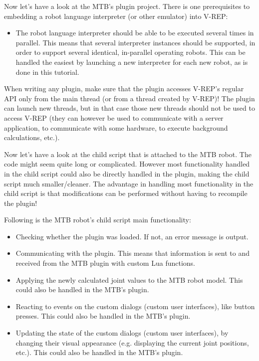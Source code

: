 Now let's have a look at the MTB's plugin project. There is one 
prerequisites to embedding a robot language interpreter (or other 
emulator) into V-REP:
\begin{itemize}[nosep]
	\item The robot language interpreter should be able to be executed 
		several times in parallel. This means that several interpreter 
		instances should be supported, in order to support several 
		identical, in-parallel operating robots. This can be handled the 
		easiest by launching a new interpreter for each new robot, as is 
		done in this tutorial.
\end{itemize}

When writing any plugin, make sure that the plugin accesses V-REP's regular 
API only from the main thread (or from a thread created by V-REP)! The plugin
can launch new threads, but in that case those new threads should not be 
used to access V-REP (they can however be used to communicate with a server 
application, to communicate with some hardware, to execute background 
calculations, etc.).

\bigskip

Now let's have a look at the child script that is attached to the MTB robot. 
The code might seem quite long or complicated. However most functionality 
handled in the child script could also be directly handled in the plugin, 
making the child script much smaller/cleaner. The advantage in handling 
most functionality in the child script is that modifications can be 
performed without having to recompile the plugin!

Following is the MTB robot's child script main functionality:
\begin{itemize}[nosep]
	\item Checking whether the plugin was loaded. If not, an error 
		message is output.
	\item Communicating with the plugin. This means that information is 
		sent to and received from the MTB plugin with custom Lua functions.
	\item Applying the newly calculated joint values to the MTB robot model. 
		This could also be handled in the MTB's plugin.
	\item Reacting to events on the custom dialogs (custom user 
		interfaces), like button presses. This could also be handled in 
		the MTB's plugin.
	\item Updating the state of the custom dialogs (custom user interfaces), 
		by changing their visual appearance (e.g. displaying the current
		joint positions, etc.). This could also be handled in the MTB's plugin.
\end{itemize}

